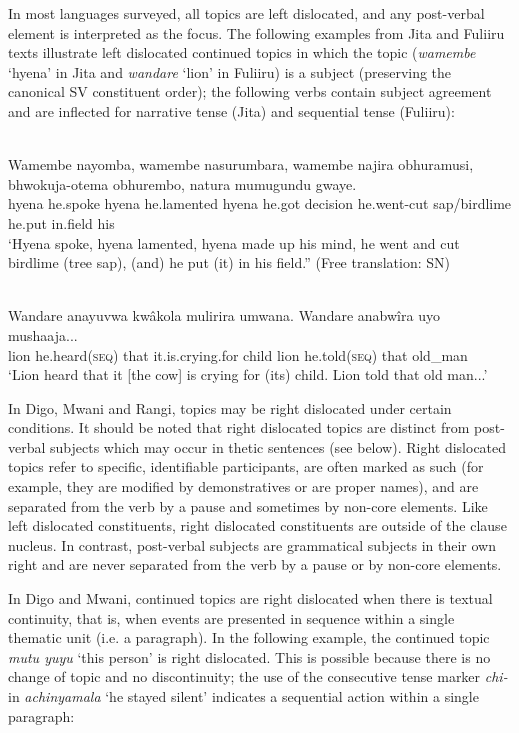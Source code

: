 \documentclass[output=paper]{langsci/langscibook}
\begin{document}
In most languages surveyed, all topics are left dislocated, and any post-verbal element is interpreted as the focus. The following examples from Jita and Fuliiru texts illustrate left dislocated continued topics in which the topic (\textit{wamembe} ‘hyena’ in Jita and \textit{wandare} ‘lion’ in Fuliiru) is a subject (preserving the canonical SV constituent order); the following verbs contain subject agreement and are inflected for narrative tense (Jita) and sequential tense (Fuliiru):

\ea\label{ex:9.nicolle}
\\
\gll Wamembe nayomba, wamembe nasurumbara, wamembe najira obhuramusi, bhwokuja-otema obhurembo, natura mumugundu gwaye.\\
     hyena he.spoke hyena he.lamented hyena he.got decision he.went-cut sap/birdlime he.put in.field his \\
\glt ‘Hyena spoke, hyena lamented, hyena made up his mind, he went and cut birdlime (tree sap), (and) he put (it) in his field.” (Free translation: SN)
\z

\ea\label{ex:10.nicolle}
\\
\gll Wandare anayuvwa kwâkola mulirira umwana. Wandare anabwîra uyo mushaaja...\\
lion he.heard(\textsc{seq}) that it.is.crying.for child lion he.told(\textsc{seq}) that old\_man  \\
\glt ‘\textup{Lion heard that it [the cow] is crying for (its) child. Lion told that old man...’}
\z

In Digo, Mwani and Rangi, topics may be right dislocated under certain conditions. It should be noted that right dislocated topics are distinct from post-verbal subjects which may occur in thetic sentences (see  below). Right dislocated topics refer to specific, identifiable participants, are often marked as such (for example, they are modified by demonstratives or are proper names), and are separated from the verb by a pause and sometimes by non-core elements. Like left dislocated constituents, right dislocated constituents are outside of the clause nucleus. In contrast, post-verbal subjects are grammatical subjects in their own right and are never separated from the verb by a pause or by non-core elements.

In Digo and Mwani, continued topics are right dislocated when there is textual continuity, that is, when events are presented in sequence within a single thematic unit (i.e. a paragraph). In the following example, the continued topic \textit{mutu yuyu} ‘this person’ is right dislocated. This is possible because there is no change of topic and no discontinuity; the use of the consecutive tense marker \textit{chi-} in \textit{achinyamala} ‘he stayed silent’ indicates a sequential action within a single paragraph:
\end{document}
